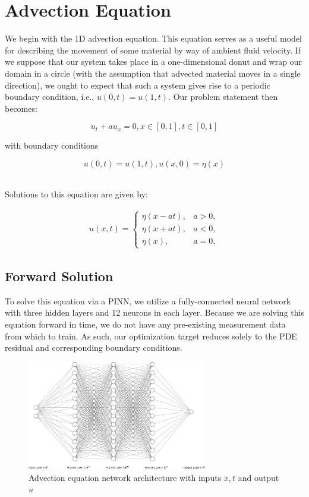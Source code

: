 \documentclass[letterpaper,11pt]{article}
\begin{document}

    \section{Advection Equation}{\label{sec:advection-equation}}
    We begin with the 1D advection equation. This equation serves as a useful model for describing the movement of some
    material by way of ambient fluid velocity. If we suppose that our system takes place in a one-dimensional donut and
    wrap our domain in a circle (with the assumption that advected material moves in a single direction), we ought to
    expect that such a system gives rise to a periodic boundary condition, i.e., $u(0, t) = u(1, t)$. Our problem
    statement then becomes:

    $$
    u_t + a u_x = 0, x \in [0, 1], t \in [0, 1]
    $$

    \noindent with boundary conditions

    $$
    u(0, t) = u(1, t), u(x, 0) = \eta(x)
    $$


    \ \\
    Solutions to this equation are given by:

    \begin{align*}
    u(x, t) = \begin{cases}
        \eta(x - at), &a > 0, \\
        \eta(x + at), &a < 0, \\
        \eta(x), &a = 0,
    \end{cases}
    \end{align*}


    \subsection*{Forward Solution}{\label{sec:advection-equation-forwared}}
    To solve this equation via a PINN, we utilize a fully-connected neural network with three hidden layers and 12 
    neurons in each layer. Because we are solving this equation forward in time, we do not have any pre-existing 
    measurement data from which to train. As such, our optimization target reduces solely to the PDE residual and 
    corresponding boundary conditions.


    \begin{figure}[h]
        \centering
        \includegraphics[width=0.70\textwidth]{nn.png}
        \caption{Advection equation network architecture with inputs $x, t$ and output $u$}
    \end{figure}
\end{document}
